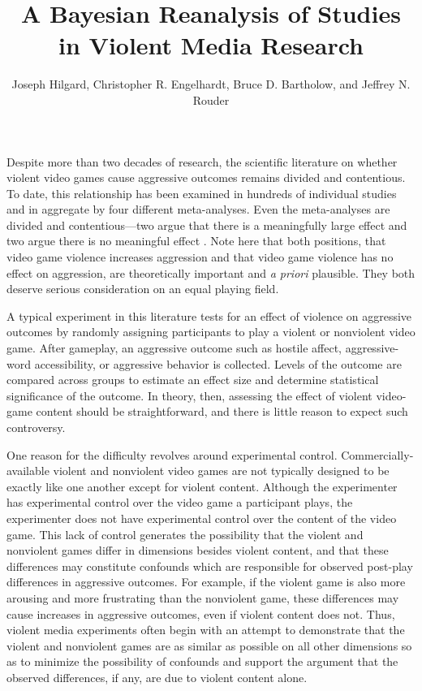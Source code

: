 \documentclass[man]{apa6}
\author{Joseph Hilgard, Christopher R. Engelhardt, Bruce D. Bartholow, and Jeffrey N. Rouder}
\title{A Bayesian Reanalysis of Studies in Violent Media Research}
\affiliation{University of Missouri - Columbia}
\begin{document}
\maketitle

Despite more than two decades of research, the scientific literature on whether violent video games cause aggressive outcomes remains divided and contentious. To date, this relationship has been examined in hundreds of individual studies and in aggregate by four different meta-analyses. Even the meta-analyses are divided and contentious---two argue that there is a meaningfully large effect \citep{Anderson:etal:2010,Greitemeyer:Mugge:2014} and two argue there is no meaningful effect \citep[e.g.,][]{Ferguson:Kilburn:2009,Sherry:2001}. Note here that both positions, that video game violence increases aggression and that video game violence has no effect on aggression, are theoretically important and {\em a priori} plausible.  They both deserve serious consideration on an equal playing field. 

A typical experiment in this literature tests for an effect of violence on aggressive outcomes by randomly assigning participants to play a violent or nonviolent video game. After gameplay, an aggressive outcome such as hostile affect, aggressive-word accessibility, or aggressive behavior is collected. Levels of the outcome are compared across groups to estimate an effect size and determine statistical significance of the outcome.  In theory, then, assessing the effect of violent video-game content should be straightforward, and there is little reason to expect such controversy.

One reason for the difficulty revolves around experimental control.  Commercially-available violent and nonviolent video games are not typically designed to be exactly like one another except for violent content. Although the experimenter has experimental control over the video game a participant plays, the experimenter does not have experimental control over the content of the video game. This lack of control generates the possibility that the violent and nonviolent games differ in dimensions besides violent content, and that these differences may constitute confounds which are responsible for observed post-play differences in aggressive outcomes. For example, if the violent game is also more arousing and more frustrating than the nonviolent game, these differences may cause increases in aggressive outcomes, even if violent content does not.   Thus, violent media experiments often begin with an attempt to demonstrate that the violent and nonviolent games are as similar as possible on all other dimensions so as to minimize the possibility of confounds and support the argument that the observed differences, if any, are due to violent content alone.
\end{document}
